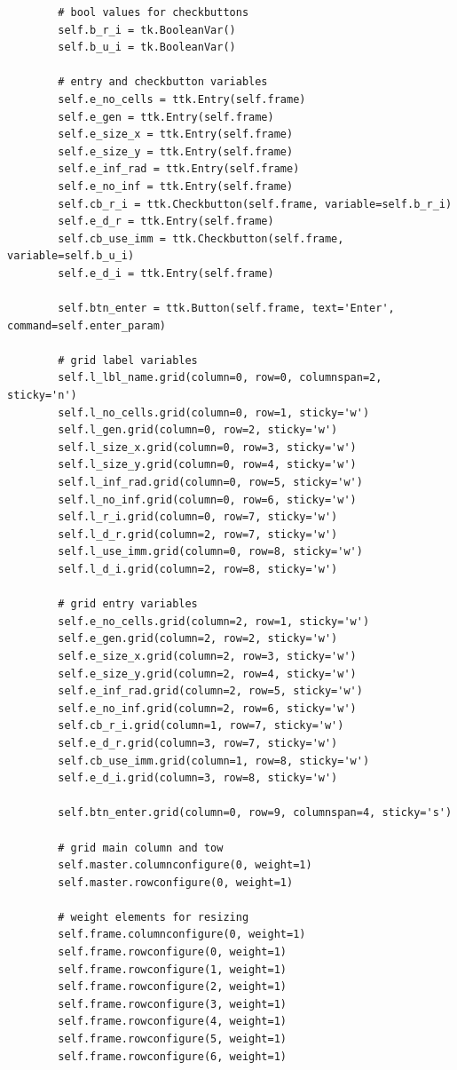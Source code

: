 \documentclass[11pt, a4paper]{article}
\begin{document}
\begin{lstlisting}
        # bool values for checkbuttons
        self.b_r_i = tk.BooleanVar()
        self.b_u_i = tk.BooleanVar()

        # entry and checkbutton variables
        self.e_no_cells = ttk.Entry(self.frame)
        self.e_gen = ttk.Entry(self.frame)
        self.e_size_x = ttk.Entry(self.frame)
        self.e_size_y = ttk.Entry(self.frame)
        self.e_inf_rad = ttk.Entry(self.frame)
        self.e_no_inf = ttk.Entry(self.frame)
        self.cb_r_i = ttk.Checkbutton(self.frame, variable=self.b_r_i)
        self.e_d_r = ttk.Entry(self.frame)
        self.cb_use_imm = ttk.Checkbutton(self.frame, variable=self.b_u_i)
        self.e_d_i = ttk.Entry(self.frame)

        self.btn_enter = ttk.Button(self.frame, text='Enter', command=self.enter_param)

        # grid label variables
        self.l_lbl_name.grid(column=0, row=0, columnspan=2, sticky='n')
        self.l_no_cells.grid(column=0, row=1, sticky='w')
        self.l_gen.grid(column=0, row=2, sticky='w')
        self.l_size_x.grid(column=0, row=3, sticky='w')
        self.l_size_y.grid(column=0, row=4, sticky='w')
        self.l_inf_rad.grid(column=0, row=5, sticky='w')
        self.l_no_inf.grid(column=0, row=6, sticky='w')
        self.l_r_i.grid(column=0, row=7, sticky='w')
        self.l_d_r.grid(column=2, row=7, sticky='w')
        self.l_use_imm.grid(column=0, row=8, sticky='w')
        self.l_d_i.grid(column=2, row=8, sticky='w')

        # grid entry variables
        self.e_no_cells.grid(column=2, row=1, sticky='w')
        self.e_gen.grid(column=2, row=2, sticky='w')
        self.e_size_x.grid(column=2, row=3, sticky='w')
        self.e_size_y.grid(column=2, row=4, sticky='w')
        self.e_inf_rad.grid(column=2, row=5, sticky='w')
        self.e_no_inf.grid(column=2, row=6, sticky='w')
        self.cb_r_i.grid(column=1, row=7, sticky='w')
        self.e_d_r.grid(column=3, row=7, sticky='w')
        self.cb_use_imm.grid(column=1, row=8, sticky='w')
        self.e_d_i.grid(column=3, row=8, sticky='w')

        self.btn_enter.grid(column=0, row=9, columnspan=4, sticky='s')

        # grid main column and tow
        self.master.columnconfigure(0, weight=1)
        self.master.rowconfigure(0, weight=1)

        # weight elements for resizing
        self.frame.columnconfigure(0, weight=1)
        self.frame.rowconfigure(0, weight=1)
        self.frame.rowconfigure(1, weight=1)
        self.frame.rowconfigure(2, weight=1)
        self.frame.rowconfigure(3, weight=1)
        self.frame.rowconfigure(4, weight=1)
        self.frame.rowconfigure(5, weight=1)
        self.frame.rowconfigure(6, weight=1)


\end{lstlisting}
\end{document}
